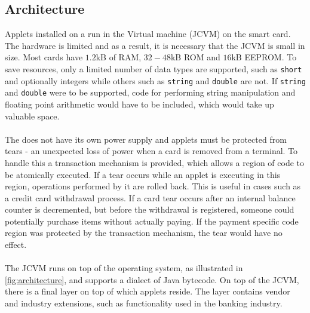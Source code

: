 \subsection{\jc Architecture}

Applets installed on a \jc run in the \jc Virtual machine (JCVM) on the smart card. The hardware is limited and as a result, it is necessary that the JCVM is small in size. Most cards have $1.2$kB of RAM, $32-48$kB ROM and $16$kB EEPROM\cite[Sec. 2.1]{java_card_spec}. To save resources, only a limited number of data types are supported, such as \texttt{short} and optionally integers while others such as \texttt{string} and \texttt{double} are not. If \texttt{string} and \texttt{double} were to be supported, code for performing string manipulation and floating point arithmetic would have to be included, which would take up valuable space.\\\\
The \jc does not have its own power supply and applets must be protected from tears - an unexpected loss of power when a card is removed from a terminal. To handle this a transaction mechanism is provided, which allows a region of code to be atomically executed. If a tear occurs while an applet is executing in this region, operations performed by it are rolled back. This is useful in cases such as a credit card withdrawal process. If a card tear occurs after an internal balance counter is decremented, but before the withdrawal is registered, someone could potentially purchase items without actually paying. If the payment specific code region was protected by the transaction mechanism, the tear would have no effect.\\\\
%
%
The JCVM runs on top of the operating system, as illustrated in \cref{fig:architecture},
and supports a dialect of Java bytecode.
On top of the JCVM, there is a final layer on top of which applets reside. The layer contains vendor and industry extensions, such as functionality used in the banking industry.\\\\
